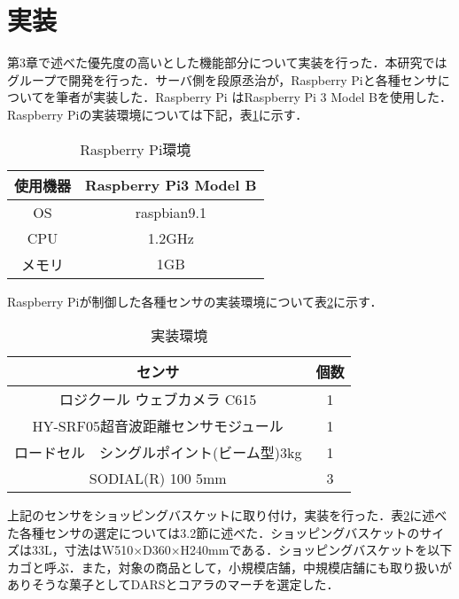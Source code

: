 

\section{実装}

第3章で述べた優先度の高いとした機能部分について実装を行った．本研究ではグループで開発を行った．サーバ側を段原丞治が，Raspberry Piと各種センサについてを筆者が実装した．Raspberry Pi はRaspberry Pi 3 Model Bを使用した．Raspberry Piの実装環境については下記，表\ref{rasp}に示す．


\begin{table}[htb]
\begin{center}
\caption{Raspberry Pi環境}
\begin{tabular}{|c||c|} \hline
使用機器 & Raspberry Pi3 Model B \\ \hline
OS & raspbian9.1 \\ \hline
CPU & 1.2GHz \\ \hline
メモリ & 1GB \\ \hline
\end{tabular}
\label{rasp}
\end{center}
\end{table}


Raspberry Piが制御した各種センサの実装環境について表\ref{jissou}に示す．


\begin{table}[htb]
\begin{center}
\caption{実装環境}
\begin{tabular}{|c|c|} \hline
センサ & 個数 \\ \hline \hline
ロジクール ウェブカメラ C615 & 1 \\
HY-SRF05超音波距離センサモジュール & 1 \\
ロードセル　シングルポイント(ビーム型)3kg & 1 \\
SODIAL(R) 100 5mm & 3 \\ \hline
\end{tabular}
\label{jissou}
\end{center}
\end{table}


上記のセンサをショッピングバスケットに取り付け，実装を行った．表\ref{jissou}に述べた各種センサの選定については3.2節に述べた．ショッピングバスケットのサイズは33L，寸法はW510×D360×H240mmである．ショッピングバスケットを以下カゴと呼ぶ．また，対象の商品として，小規模店舗，中規模店舗にも取り扱いがありそうな菓子としてDARSとコアラのマーチを選定した．

